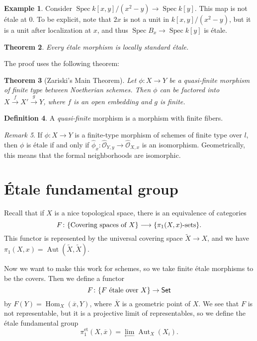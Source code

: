 \documentclass[leqno, openany]{memoir}
\newtheorem{thm}{Theorem}[section]
\theoremstyle{definition}
\newtheorem{defn}[thm]{Definition}
\newtheorem{exm}[thm]{Example}
\theoremstyle{remark}
\newtheorem{rmk}[thm]{Remark}
\theoremstyle{plain}
\theoremstyle{definition}
\theoremstyle{remark}
\newcommand{\mc}[1]{\mathcal{#1}}
\newcommand{\mr}[1]{\mathrm{#1}}
\newcommand{\ms}[1]{\mathsf{#1}}
\newcommand{\ol}[1]{\overline{#1}}
\newcommand{\wt}[1]{\widetilde{#1}}
\newcommand{\wh}[1]{\widehat{#1}}
\DeclareMathOperator{\Hom}{Hom}
\DeclareMathOperator{\Aut}{Aut}
\DeclareMathOperator{\Spec}{Spec}
\begin{document}
\begin{exm}
    Consider $\Spec k[x,y]/(x^2-y) \to \Spec k[y]$. This map is not \'etale at $0$. To be explicit, note that $2x$ is not a unit in $k[x,y]/(x^2-y)$, but it is a unit after localization at $x$, and thus $\Spec B_x \to \Spec k[y]$ is \'etale.
\end{exm}

\begin{thm}
    Every \'etale morphism is locally standard \'etale.
\end{thm}

The proof uses the following theorem:

\begin{thm}[Zariski's Main Theorem]
    Let $\phi \colon X \to Y$ be a quasi-finite morphism of finite type between Noetherian schemes. Then $\phi$ can be factored into $X \xrightarrow{f} X' \xrightarrow{g} Y$, where $f$ is an open embedding and $g$ is finite.
\end{thm}

\begin{defn}
    A \textit{quasi-finite} morphism is a morphism with finite fibers.
\end{defn}

\begin{rmk}
    If $\phi \colon X \to Y$ is a finite-type morphism of schemes of finite type over $l$, then $\phi$ is \'etale if and only if $\wh{\phi}_x \colon \wh{\mc{O}}_{Y,y} \to \wh{\mc{O}}_{X,x}$ is an isomorphism. Geometrically, this means that the formal neighborhoods are isomorphic.
\end{rmk}

\section{\'Etale fundamental group}%
\label{sec:'etale_fundamental_group}

Recall that if $X$ is a nice topological space, there is an equivalence of categories
\[ F \colon \qty{ \text{Covering spaces of $X$} } \longrightarrow \qty{ \pi_1(X,x)\text{-sets} }. \]
This functor is represented by the universal covering space $\wt{X} \to X$, and we have $\pi_1(X,x) = \Aut (\wt{X}, \wt{X})$.

Now we want to make this work for schemes, so we take finite \'etale morphisms to be the covers. Then we define a functor
\[ F \colon \qty{F \text{ \'etale over }X} \to \ms{Set} \]
by $F(Y) = \Hom_X(\ol{x}, Y)$, where $\ol{X}$ is a geometric point of $X$. We see that $F$ is not representable, but it is a projective limit of representables, so we define the \'etale fundamental group 
\[ \pi_1^{\mr{et}}(X,\ol{x}) = \lim_{\gets} \Aut_X(X_i). \]
\end{document}
